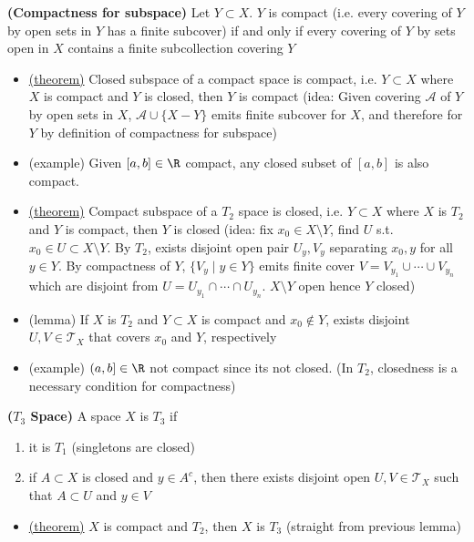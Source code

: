 \documentclass[10.5pt]{article}
\newcommand{\calA}{\mathcal{A}}
\newcommand{\calT}{\mathcal{T}}
\begin{document}
\begin{defn*}
    \textbf{(Compactness for subspace)}  Let $Y\subset X$. $Y$ is compact (i.e. every covering of $Y$ by open sets in $Y$ has a finite subcover) if and only if every covering of $Y$ by sets open in $X$ contains a finite subcollection covering $Y$
    \begin{itemize}
        \item \underline{(theorem)} Closed subspace of a compact space is compact, i.e. $Y\subset X$ where $X$ is compact and $Y$ is closed, then $Y$ is compact (idea: Given covering $\calA$ of $Y$ by open sets in $X$, $\calA \cup \{X - Y\}$ emits finite subcover for $X$, and therefore for $Y$ by definition of compactness for subspace)
        \item (example) Given $[a,b]\in\R$ compact, any closed subset of $[a,b]$ is also compact.
        \item \underline{(theorem)} Compact subspace of a $T_2$ space is closed, i.e. $Y\subset X$ where $X$ is $T_2$ and $Y$ is compact, then $Y$ is closed (idea: fix $x_0\in X\setminus Y$, find $U$ s.t. $x_0\in U\subset X\setminus Y$. By $T_2$, exists disjoint open pair $U_{y},V_{y}$ separating $x_0,y$ for all $y\in Y$. By compactness of $Y$, $\{V_y\mid y\in Y\}$ emits finite cover $V =V_{y_1}\cup \cdots \cup V_{y_n}$ which are disjoint from $U=U_{y_1}\cap\cdots\cap U_{y_n}$. $X\setminus Y$ open hence $Y$ closed)
        \item (lemma) If $X$ is $T_2$ and $Y\subset X$ is compact and $x_0\not\in Y$, exists disjoint $U,V\in\calT_X$ that covers $x_0$ and $Y$, respectively
        \item (example) $(a,b] \in \R$ not compact since its not closed. (In $T_2$, closedness is a necessary condition for compactness)
    \end{itemize}
\end{defn*}

\begin{defn*}
    \textbf{($T_3$ Space)} A space $X$ is $T_3$ if
    \begin{enumerate}
        \item it is $T_1$ (singletons are closed)
        \item if $A \subset X$ is closed and $y \in A^c$, then there exists disjoint open $U,V\in\calT_X$ such that $A\subset U$ and $y\in V$
    \end{enumerate}
    \begin{itemize}
        \item \underline{(theorem)} $X$ is compact and $T_2$, then $X$ is $T_3$ (straight from previous lemma)
    \end{itemize}
\end{defn*}
\end{document}
